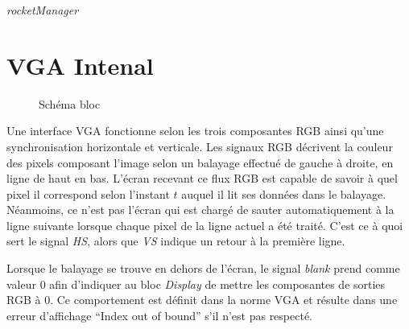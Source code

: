 \documentclass[french]{nakrule}
\begin{document}
\emph{rocketManager} 

\clearpage

\section{VGA Intenal}
\label{sec:vgainternal}


\begin{figure}
\caption{Schéma bloc}
\label{vgaInternalBloc}
\end{figure}

Une interface VGA fonctionne selon les trois composantes RGB ainsi qu’une
synchronisation horizontale et verticale. Les signaux RGB décrivent
la couleur des pixels composant l’image selon un balayage effectué de gauche à
droite, en ligne de haut en bas. L’écran recevant ce flux RGB est capable de
savoir à quel pixel il correspond selon l’instant $t$ auquel il lit ses données
dans le balayage. Néanmoins, ce n’est pas l’écran qui est chargé de sauter
automatiquement à la ligne suivante lorsque chaque pixel de la ligne actuel a
été traité. C’est ce à quoi sert le signal \emph{HS}, alors que \emph{VS} indique un retour à
la première ligne.


Lorsque le balayage se trouve en dehors de l'écran, le signal \emph{blank} prend
comme valeur 0 afin d'indiquer au bloc \emph{Display} de mettre les composantes
de sorties RGB à 0. Ce comportement est définit dans la norme VGA et résulte
dans une erreur d'affichage ``Index out of bound'' s'il n'est pas respecté.
\end{document}
